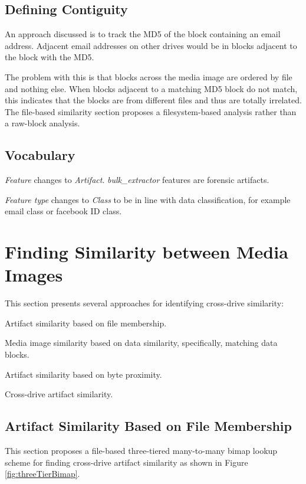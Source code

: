 \documentclass[12pt,twoside]{article}
\newcommand \bulk {\textit{bulk\_extractor}\xspace}
\begin{document}
\subsection{Defining Contiguity}
An approach discussed is to track the MD5 of the block containing an email address.  Adjacent email addresses on other drives would be in blocks adjacent to the block with the MD5.

The problem with this is that blocks across the media image are ordered by file and nothing else.  When blocks adjacent to a matching MD5 block do not match, this indicates that the blocks are from different files and thus are totally irrelated.  The file-based similarity section proposes a filesystem-based analysis rather than a raw-block analysis.

\subsection{Vocabulary}
\begin{compactitem}
\item \textit{Feature} changes to \textit{Artifact}.  \bulk features are forensic artifacts.
\item \textit{Feature type} changes to \textit{Class} to be in line with data classification, for example email class or facebook ID class.
\end{compactitem}

\section{Finding Similarity between Media Images}
This section presents several approaches for identifying cross-drive similarity:
\begin{compactitem}
\item Artifact similarity based on file membership.
\item Media image similarity based on data similarity, specifically, matching data blocks.
\item Artifact similarity based on byte proximity.
\item Cross-drive artifact similarity.
\end{compactitem}


\subsection{Artifact Similarity Based on File Membership}
This section proposes a file-based three-tiered many-to-many bimap lookup scheme for finding cross-drive artifact similarity as shown in Figure \ref{fig:threeTierBimap}.
\end{document}
